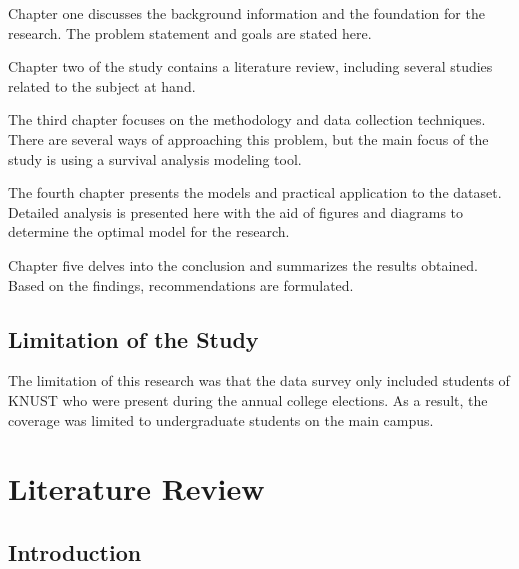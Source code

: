 \documentclass[12pt]{report}
\begin{document}
Chapter one discusses the background information and the foundation for the research. The problem statement and goals are stated here.

Chapter two of the study contains a literature review, including several studies related to the subject at hand.

The third chapter focuses on the methodology and data collection techniques. There are several ways of approaching this problem, but the main focus of the study is using a survival analysis modeling tool.

The fourth chapter presents the models and practical application to the dataset. Detailed analysis is presented here with the aid of figures and diagrams to determine the optimal model for the research.

Chapter five delves into the conclusion and summarizes the results obtained. Based on the findings, recommendations are formulated.

\section{Limitation of the Study}

The limitation of this research was that the data survey only included students of KNUST who were present during the annual college elections. As a result, the coverage was limited to undergraduate students on the main campus.

\newpage
\chapter{Literature Review}

\section{Introduction}
\section{}
\section{}
\section{}
\section{}
\end{document}
